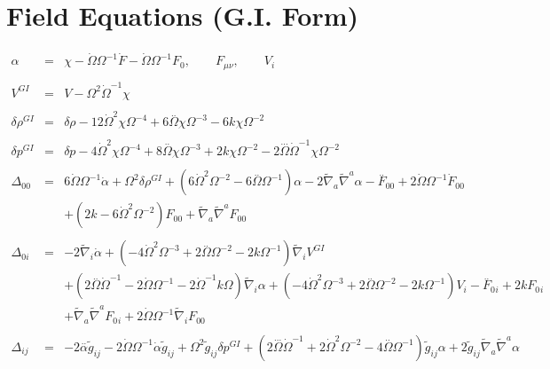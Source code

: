 \documentclass[10pt,letterpaper]{article}
\numberwithin{equation}{section}
\begin{document}
\section{Field Equations (G.I. Form)}
\begin{eqnarray}
\alpha  &=& \chi -   \dot{\Omega} \Omega^{-1}\dot{F} -  \dot{\Omega}\Omega^{-1}F_{0}{}, \qquad F_{\mu\nu},\qquad V_i
\\ \nonumber\\
V^{GI} &=& V-\Omega^2 \dot \Omega^{-1}\chi
\\ \nonumber\\
\delta \rho^{GI}&=&\delta \rho - 12 \dot{\Omega}^2 \chi \Omega^{-4} + 6 \overset{..}{\Omega} \chi \Omega^{-3} - 6 k \chi \Omega^{-2}
\\ \nonumber\\ 
\delta p^{GI}&=&\delta p - 4 \dot{\Omega}^2 \chi \Omega^{-4} + 8 \overset{..}{\Omega} \chi \Omega^{-3} + 2 k \chi \Omega^{-2} - 2 \overset{...}{\Omega} \dot{\Omega}^{-1} \chi \Omega^{-2}
\\ \nonumber\\
\Delta_{00}&=& 6 \dot{\Omega} \Omega^{-1} \dot{\alpha} + \Omega^2 \delta \rho^{GI}{} + (6 \dot{\Omega}^2 \Omega^{-2} - 6 \overset{..}{\Omega} \Omega^{-1}) \alpha - 2 \tilde{\nabla}_{a}\tilde{\nabla}^{a}\alpha - \overset{..}{F}_{00}{} + 2 \dot{\Omega} \Omega^{-1} \dot{F}_{00}{} \nonumber \\ 
&& + (2 k - 6 \dot{\Omega}^2 \Omega^{-2}) F_{00}{} + \tilde{\nabla}_{a}\tilde{\nabla}^{a}F_{00}{}
\\  \nonumber\\ 
\Delta_{0i}&=& -2 \tilde{\nabla}_{i}\dot{\alpha} + (-4 \dot{\Omega}^2 \Omega^{-3} + 2 \overset{..}{\Omega} \Omega^{-2} - 2 k \Omega^{-1}) \tilde{\nabla}_{i}V^{GI}{} \nonumber \\ 
&& + (2 \overset{..}{\Omega} \dot{\Omega}^{-1} - 2 \dot{\Omega} \Omega^{-1} - 2 \dot{\Omega}^{-1} k \Omega) \tilde{\nabla}_{i}\alpha +(-4 \dot{\Omega}^2 \Omega^{-3} + 2 \overset{..}{\Omega} \Omega^{-2} - 2 k \Omega^{-1}) V_{i}- \overset{..}{F}_{0}{}_{i} + 2 k F_{0}{}_{i} \nonumber \\ 
&& + \tilde{\nabla}_{a}\tilde{\nabla}^{a}F_{0}{}_{i} + 2 \dot{\Omega} \Omega^{-1} \tilde{\nabla}_{i}F_{00}{}
\\  \nonumber\\ 
\Delta_{ij}&=& -2 \overset{..}{\alpha} \tilde{g}_{ij} - 2 \dot{\Omega} \Omega^{-1} \dot{\alpha} \tilde{g}_{ij} + \Omega^2 \tilde{g}_{ij} \delta p^{GI}{} + (2 \overset{...}{\Omega} \dot{\Omega}^{-1} + 2 \dot{\Omega}^2 \Omega^{-2} - 4 \overset{..}{\Omega} \Omega^{-1}) \tilde{g}_{ij} \alpha + 2 \tilde{g}_{ij} \tilde{\nabla}_{a}\tilde{\nabla}^{a}\alpha \nonumber \\ 

\end{eqnarray}
\end{document}
